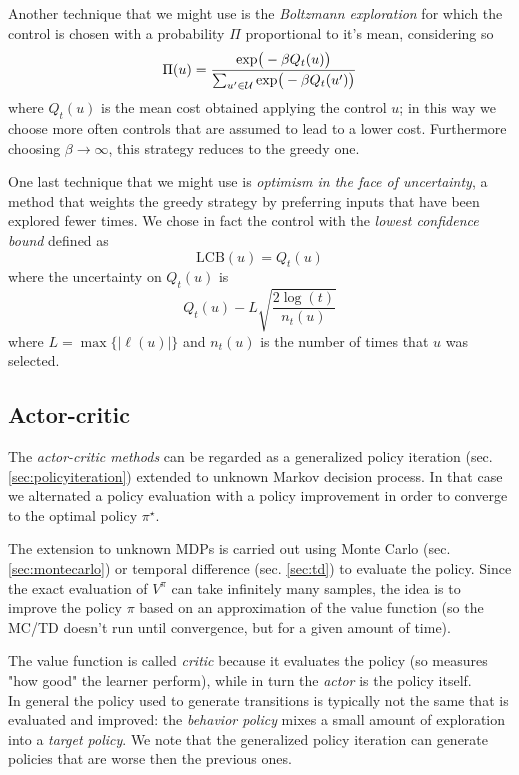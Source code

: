 	
	Another technique that we might use is the \textit{Boltzmann exploration} for which the control is chosen with a probability $\Pi$ proportional to it's mean, considering so
	\begin{equation}
		\Pi(u) = \frac{\textrm{exp}\big(-\beta Q_t(u)\big)}{\sum_{u'\in\mathcal U} \textrm{exp}\big(-\beta Q_t(u')\big)}
	\end{equation}
	where $Q_t(u)$ is the mean cost obtained applying the control $u$; in this way we choose more often controls that are assumed to lead to a lower cost. Furthermore choosing $\beta\rightarrow \infty$, this strategy reduces to the greedy one.
	
	One last technique that we might use is \textit{optimism in the face of uncertainty}, a method that weights the greedy strategy by preferring inputs that have been explored fewer times. We chose in fact the control with the \textit{lowest confidence bound} defined as
	\begin{equation}
		\textrm{LCB}(u) = Q_t(u)
	\end{equation}
	where the uncertainty on $Q_t(u)$ is
	\[ Q_t(u) - L \sqrt{\frac{2\log(t)}{n_t(u)}} \]
	where $L = \max\{|\ell(u)|\}$ and $n_t(u)$ is the number of times that $u$ was selected.
	
\subsection{Actor-critic}
	The \textit{actor-critic methods} can be regarded as a generalized policy iteration (sec. \ref{sec:policyiteration}) extended to unknown Markov decision process. In that case we alternated a policy evaluation with a policy improvement in order to converge to the optimal policy $\pi^\star$.
	
	The extension to unknown MDPs is carried out using Monte Carlo (sec. \ref{sec:montecarlo}) or temporal difference (sec. \ref{sec:td}) to evaluate the policy. Since the exact evaluation of $V^\pi$ can take infinitely many samples, the idea is to improve the policy $\pi$ based on an approximation of the value function (so the MC/TD doesn't run until convergence, but for a given amount of time).
	
	The value function is called \textit{critic} because it evaluates the policy (so measures "how good" the learner perform), while in turn the \textit{actor} is the policy itself. \\
	In general the policy used to generate transitions is typically not the same that is evaluated and improved: the \textit{behavior policy} mixes a small amount of exploration into a \textit{target policy}. We note that the generalized policy iteration can generate policies that are worse then the previous ones.
	
